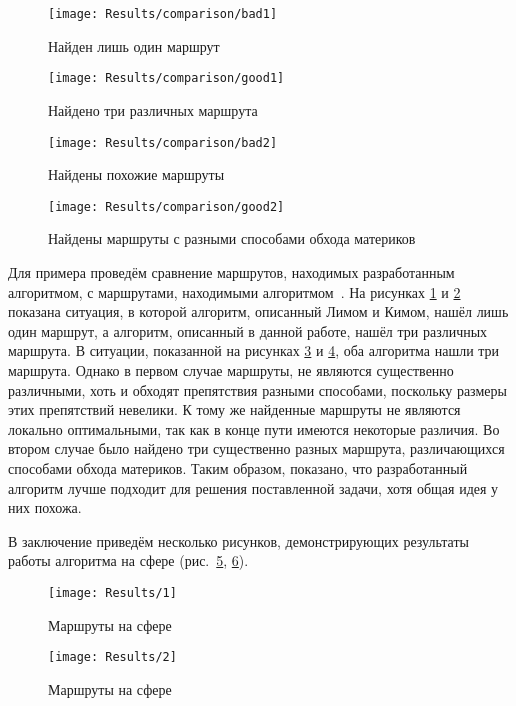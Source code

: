 \begin{figure}
    \texttt{[image: Results/comparison/bad1]}
    \caption{Найден лишь один маршрут}
    \label{fig:res-comp-bad1}
\end{figure}

\begin{figure}
    \texttt{[image: Results/comparison/good1]}
    \caption{Найдено три различных маршрута}
    \label{fig:res-comp-good1}
\end{figure}

\begin{figure}
    \texttt{[image: Results/comparison/bad2]}
    \caption{Найдены похожие маршруты}
    \label{fig:res-comp-bad2}
\end{figure}

\begin{figure}
    \texttt{[image: Results/comparison/good2]}
    \caption{Найдены маршруты с разными способами обхода материков}
    \label{fig:res-comp-good2}
\end{figure}

Для примера проведём сравнение маршрутов, находимых разработанным
алгоритмом, с маршрутами, находимыми
алгоритмом~\cite{lim2005shortest}. На рисунках \ref{fig:res-comp-bad1}
и \ref{fig:res-comp-good1} показана ситуация, в которой алгоритм,
описанный Лимом и Кимом, нашёл лишь один маршрут, а алгоритм,
описанный в данной работе, нашёл три различных маршрута. В ситуации,
показанной на рисунках \ref{fig:res-comp-bad2} и
\ref{fig:res-comp-good2}, оба алгоритма нашли три маршрута. Однако в
первом случае маршруты, не являются существенно различными, хоть и
обходят препятствия разными способами, поскольку размеры этих
препятствий невелики. К тому же найденные маршруты не являются
локально оптимальными, так как в конце пути имеются некоторые
различия. Во втором случае было найдено три существенно разных
маршрута, различающихся способами обхода материков. Таким образом,
показано, что разработанный алгоритм лучше подходит для решения
поставленной задачи, хотя общая идея у них похожа.

В заключение приведём несколько рисунков, демонстрирующих результаты
работы алгоритма на сфере (рис.~\ref{fig:result1}, \ref{fig:result2}).

\begin{figure}
    \texttt{[image: Results/1]}
    \caption{Маршруты на сфере}
    \label{fig:result1}
\end{figure}

\begin{figure}
    \texttt{[image: Results/2]}
    \caption{Маршруты на сфере}
    \label{fig:result2}
\end{figure}

\FloatBarrier

